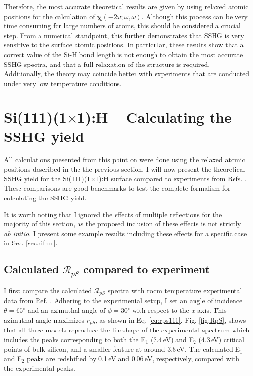 Therefore, the most accurate theoretical results are given by using relaxed
atomic positions for the calculation of
$\boldsymbol{\chi}(-2\omega;\omega,\omega)$. Although this process can be very
time consuming for large numbers of atoms, this should be considered a crucial
step. From a numerical standpoint, this further demonstrates that SSHG is very
sensitive to the surface atomic positions. In particular, these results show
that a correct value of the Si-H bond length is not enough to obtain the most
accurate SSHG spectra, and that a full relaxation of the structure is required.
Additionally, the theory may coincide better with experiments that are conducted
under very low temperature conditions.



\section{\texorpdfstring{Si(111)(1$\times$1):H}{Si(111)(1x1):H} -- Calculating 
the SSHG yield}

All calculations presented from this point on were done using the relaxed atomic
positions described in the the previous section. I will now present the
theoretical SSHG yield for the Si(111)(1$\times$1):H surface compared to
experiments from Refs. \cite{mitchellSS01, mejiaPRB02, bergfeldPRL04}. These
comparisons are good benchmarks to test the complete formalism for calculating
the SSHG yield.

It is worth noting that I ignored the effects of multiple reflections for the
majority of this section, as the proposed inclusion of these effects is not
strictly \emph{ab initio}. I present some example results including these
effects for a specific case in Sec. \ref{sec:rifmr}.



\subsection{Calculated \texorpdfstring{$\mathcal{R}_{pS}$}{RpS} compared to 
experiment}\label{sec: RpS}

I first compare the calculated $\mathcal{R}_{pS}$ spectra with room temperature
experimental data from Ref. \cite{mejiaPRB02}. Adhering to the experimental
setup, I set an angle of incidence $\theta=65^{\circ}$ and an azimuthal angle of
$\phi=30^\circ$ with respect to the $x$-axis. This azimuthal angle maximizes
$r_{pS}$, as shown in Eq. \eqref{eq:rps111}. Fig. \ref{fig:RpS}, shows that all
three models reproduce the lineshape of the experimental spectrum which includes
the peaks corresponding to both the E$_{1}$ (3.4\,eV) and E$_{2}$ (4.3\,eV)
critical points of bulk silicon, and a smaller feature at around 3.8\,eV. The
calculated E$_{1}$ and E$_{2}$ peaks are redshifted by 0.1\,eV and 0.06\,eV,
respectively, compared with the experimental peaks.

